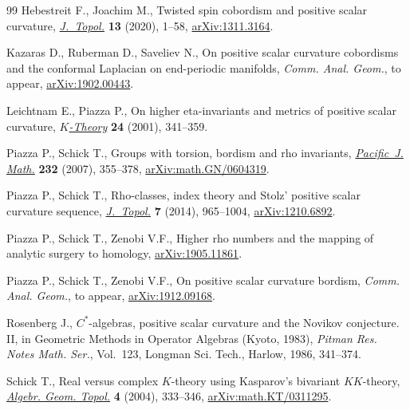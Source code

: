 \begin{thebibliography}{99}
Hebestreit F., Joachim M., Twisted spin cobordism and positive scalar
 curvature, \href{https://doi.org/10.1112/topo.12122}{\textit{J.~Topol.}} \textbf{13} (2020), 1--58, \href{https://arxiv.org/abs/1311.3164}{arXiv:1311.3164}.

Kazaras D., Ruberman D., Saveliev N., On positive scalar curvature cobordisms
 and the conformal {L}aplacian on end-periodic manifolds, \textit{Comm. Anal.
 Geom.}, {t}o appear, \href{https://arxiv.org/abs/1902.00443}{arXiv:1902.00443}.

Leichtnam E., Piazza P., On higher eta-invariants and metrics of positive
 scalar curvature, \href{https://doi.org/10.1023/A:1014079307698}{\textit{$K$-Theory}} \textbf{24} (2001), 341--359.

Piazza P., Schick T., Groups with torsion, bordism and rho invariants,
 \href{https://doi.org/10.2140/pjm.2007.232.355}{\textit{Pacific~J. Math.}} \textbf{232} (2007), 355--378,
 \href{https://arxiv.org/abs/math.GN/0604319}{arXiv:math.GN/0604319}.

Piazza P., Schick T., Rho-classes, index theory and {S}tolz' positive scalar
 curvature sequence, \href{https://doi.org/10.1112/jtopol/jtt048}{\textit{J.~Topol.}} \textbf{7} (2014), 965--1004,
 \href{https://arxiv.org/abs/1210.6892}{arXiv:1210.6892}.

Piazza P., Schick T., Zenobi V.F., Higher rho numbers and the mapping of
 analytic surgery to homology, \href{https://arxiv.org/abs/1905.11861}{arXiv:1905.11861}.

Piazza P., Schick T., Zenobi V.F., On positive scalar curvature bordism,
 \textit{Comm. Anal. Geom.}, {t}o appear, \href{https://arxiv.org/abs/1912.09168}{arXiv:1912.09168}.

Rosenberg J., {$C^\ast$}-algebras, positive scalar curvature and the {N}ovikov
 conjecture. {II}, in Geometric Methods in Operator Algebras ({K}yoto, 1983),
 \textit{Pitman Res. Notes Math. Ser.}, Vol.~123, Longman Sci. Tech., Harlow,
 1986, 341--374.

Schick T., Real versus complex {$K$}-theory using {K}asparov's bivariant
 {$KK$}-theory, \href{https://doi.org/10.2140/agt.2004.4.333}{\textit{Algebr. Geom. Topol.}} \textbf{4} (2004), 333--346,
 \href{https://arxiv.org/abs/math.KT/0311295}{arXiv:math.KT/0311295}.


\end{thebibliography}
